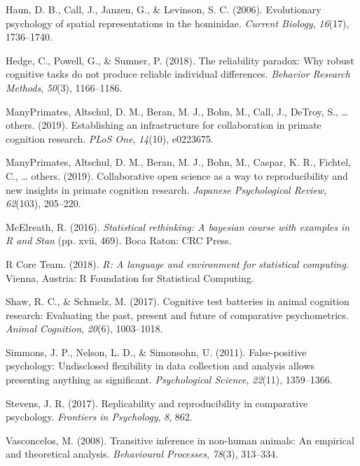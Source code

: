 \documentclass[10pt, letterpaper]{article}
\begin{document}
\leavevmode\hypertarget{ref-haun2006evolutionary}{}%
Haun, D. B., Call, J., Janzen, G., \& Levinson, S. C. (2006).
Evolutionary psychology of spatial representations in the hominidae.
\emph{Current Biology}, \emph{16}(17), 1736--1740.

\leavevmode\hypertarget{ref-hedge2018reliability}{}%
Hedge, C., Powell, G., \& Sumner, P. (2018). The reliability paradox:
Why robust cognitive tasks do not produce reliable individual
differences. \emph{Behavior Research Methods}, \emph{50}(3), 1166--1186.

\leavevmode\hypertarget{ref-many2019establishing}{}%
ManyPrimates, Altschul, D. M., Beran, M. J., Bohn, M., Call, J., DeTroy,
S., \ldots{} others. (2019). Establishing an infrastructure for
collaboration in primate cognition research. \emph{PLoS One},
\emph{14}(10), e0223675.

\leavevmode\hypertarget{ref-primates2019collaborative}{}%
ManyPrimates, Altschul, D. M., Beran, M. J., Bohn, M., Caspar, K. R.,
Fichtel, C., \ldots{} others. (2019). Collaborative open science as a
way to reproducibility and new insights in primate cognition research.
\emph{Japanese Psychological Review}, \emph{62}(103), 205--220.

\leavevmode\hypertarget{ref-rethinking}{}%
McElreath, R. (2016). \emph{Statistical rethinking: A bayesian course
with examples in R and Stan} (pp. xvii, 469). Boca Raton: CRC Press.

\leavevmode\hypertarget{ref-R-base}{}%
R Core Team. (2018). \emph{R: A language and environment for statistical
computing}. Vienna, Austria: R Foundation for Statistical Computing.

\leavevmode\hypertarget{ref-shaw2017cognitive}{}%
Shaw, R. C., \& Schmelz, M. (2017). Cognitive test batteries in animal
cognition research: Evaluating the past, present and future of
comparative psychometrics. \emph{Animal Cognition}, \emph{20}(6),
1003--1018.

\leavevmode\hypertarget{ref-simmons2011false}{}%
Simmons, J. P., Nelson, L. D., \& Simonsohn, U. (2011). False-positive
psychology: Undisclosed flexibility in data collection and analysis
allows presenting anything as significant. \emph{Psychological Science},
\emph{22}(11), 1359--1366.

\leavevmode\hypertarget{ref-stevens2017replicability}{}%
Stevens, J. R. (2017). Replicability and reproducibility in comparative
psychology. \emph{Frontiers in Psychology}, \emph{8}, 862.

\leavevmode\hypertarget{ref-vasconcelos2008transitive}{}%
Vasconcelos, M. (2008). Transitive inference in non-human animals: An
empirical and theoretical analysis. \emph{Behavioural Processes},
\emph{78}(3), 313--334.
\end{document}
